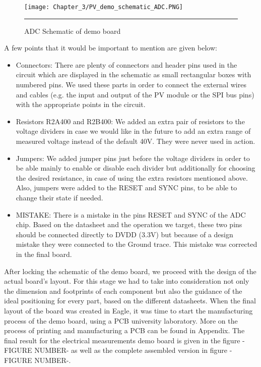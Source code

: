 \begin{figure}[p]
	\centering
		\texttt{[image: Chapter\_3/PV\_demo\_schematic\_ADC.PNG]}
		\rule{35em}{0.5pt}
	\caption{ADC Schematic of demo board}
	\label{fig:PV_demo_schematic_ADC}
\end{figure}

A few points that it would be important to mention are given below:

\begin{itemize}
    \item Connectors: There are plenty of connectors and header pins used in the circuit which are displayed in the schematic as small rectangular boxes with numbered pins. We used these parts in order to connect the external wires and cables (e.g. the input and output of the PV module or the SPI bus pins) with the appropriate points in the circuit.
    \item Resistors R2A400 and R2B400: We added an extra pair of resistors to the voltage dividers in case we would like in the future to add an extra range of measured voltage instead of the default 40V. They were never used in action.
    \item Jumpers: We added jumper pins just before the voltage dividers in order to be able mainly to enable or disable each divider but additionally for choosing the desired resistance, in case of using the extra resistors mentioned above. Also, jumpers were added to the RESET and SYNC pins, to be able to change their state if needed.
    \item MISTAKE: There is a mistake in the pins RESET and SYNC of the ADC chip. Based on the datasheet and the operation we target, these two pins should be connected directly to DVDD (3.3V) but because of a design mistake they were connected to the Ground trace. This mistake was corrected in the final board.
    
\end{itemize}

After locking the schematic of the demo board, we proceed with the design of the actual board's layout. For this stage we had to take into consideration not only the dimension and footprints of each component but also the guidance of the ideal positioning for every part, based on the different datasheets. When the final layout of the board was created in Eagle, it was time to start the manufacturing process of the demo board, using a PCB university laboratory. More on the process of printing and manufacturing a PCB can be found in Appendix. The final result for the electrical measurements demo board is given in the figure -FIGURE NUMBER- as well as the complete assembled version in figure -FIGURE NUMBER-.\\

